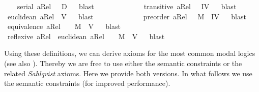 \begin{isabellebody}
{\isafoldproof}%
%
\isadelimproof
%
\endisadelimproof
\isanewline
\ \ \isamarkupfalse%
\ {\isachardoublequoteopen}serial\ aRel\ \ {\isasymLongrightarrow}\ {\isasymlfloor}D{\isasymrfloor}{\isachardoublequoteclose}%
\isadelimproof
\ %
\endisadelimproof
%
\isatagproof
{}\isamarkupfalse%
\ blast%
\endisatagproof
{\isafoldproof}%
%
\isadelimproof
%
\endisadelimproof
\ \ \ \ \ \ \ \ \ \isanewline
\ \ \isamarkupfalse%
\ {\isachardoublequoteopen}transitive\ aRel\ \ {\isasymLongrightarrow}\ {\isasymlfloor}IV{\isasymrfloor}{\isachardoublequoteclose}%
\isadelimproof
\ %
\endisadelimproof
%
\isatagproof
{}\isamarkupfalse%
\ blast%
\endisatagproof
{\isafoldproof}%
%
\isadelimproof
%
\endisadelimproof
\ \ \ \isanewline
\ \ \isamarkupfalse%
\ {\isachardoublequoteopen}euclidean\ aRel\ {\isasymLongrightarrow}\ {\isasymlfloor}V{\isasymrfloor}{\isachardoublequoteclose}%
\isadelimproof
\ %
\endisadelimproof
%
\isatagproof
{}\isamarkupfalse%
\ blast%
\endisatagproof
{\isafoldproof}%
%
\isadelimproof
%
\endisadelimproof
\ \ \ \ \ \ \ \ \ \isanewline
\ \ \isamarkupfalse%
\ {\isachardoublequoteopen}preorder\ aRel\ {\isasymLongrightarrow}\ \ {\isasymlfloor}M{\isasymrfloor}\ {\isasymand}\ {\isasymlfloor}IV{\isasymrfloor}{\isachardoublequoteclose}%
\isadelimproof
\ %
\endisadelimproof
%
\isatagproof
{}\isamarkupfalse%
\ blast\ %
%
\endisatagproof
{\isafoldproof}%
%
\isadelimproof
%
\endisadelimproof
\isanewline
\ \ \isamarkupfalse%
\ {\isachardoublequoteopen}equivalence\ aRel\ \ {\isasymLongrightarrow}\ \ {\isasymlfloor}M{\isasymrfloor}\ {\isasymand}\ {\isasymlfloor}V{\isasymrfloor}{\isachardoublequoteclose}%
\isadelimproof
\ %
\endisadelimproof
%
\isatagproof
{}\isamarkupfalse%
\ blast\ %
%
\endisatagproof
{\isafoldproof}%
%
\isadelimproof
%
\endisadelimproof
\isanewline
\ \ \isamarkupfalse%
\ {\isachardoublequoteopen}reflexive\ aRel\ {\isasymand}\ euclidean\ aRel\ \ {\isasymLongrightarrow}\ \ {\isasymlfloor}M{\isasymrfloor}\ {\isasymand}\ {\isasymlfloor}V{\isasymrfloor}{\isachardoublequoteclose}%
\isadelimproof
\ %
\endisadelimproof
%
\isatagproof
{}\isamarkupfalse%
\ blast\ %
%
\endisatagproof
{\isafoldproof}%
%
\isadelimproof
%
\endisadelimproof
%
\begin{isamarkuptext}%
Using these definitions, we can derive axioms for the most common modal logics (see also \cite{C47}). 
  Thereby we are free to use either the semantic constraints or the related \emph{Sahlqvist} axioms. Here we provide 
  both versions. In what follows we use the semantic constraints (for improved performance).
  \pagebreak%
\end{isamarkuptext}\isamarkuptrue%
%
\isadelimtheory
%
\endisadelimtheory
%
\isatagtheory
%
\endisatagtheory
{\isafoldtheory}%
%
\isadelimtheory
%
\endisadelimtheory
%
\end{isabellebody}%
